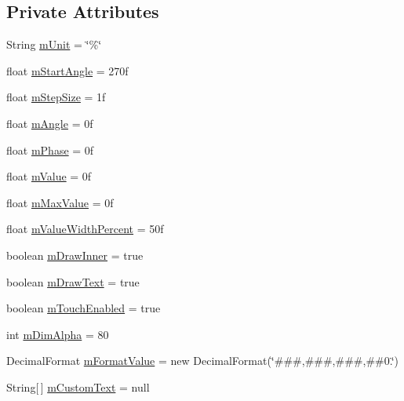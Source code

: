 \subsection*{Private Attributes}
\begin{DoxyCompactItemize}
\item 
String \hyperlink{classcs_1_1usense_1_1_circle_display_aa4629b8ff331f623b98a6380ba49d4be}{m\+Unit} = \char`\"{}\%\char`\"{}
\item 
float \hyperlink{classcs_1_1usense_1_1_circle_display_a5141939196ad8880e27ab7be82f72793}{m\+Start\+Angle} = 270f
\item 
float \hyperlink{classcs_1_1usense_1_1_circle_display_ae35b4776dda580d3aa865f204efcffec}{m\+Step\+Size} = 1f
\item 
float \hyperlink{classcs_1_1usense_1_1_circle_display_a5f3c0c5c31e3f607b7ba95d7d1d0e36d}{m\+Angle} = 0f
\item 
float \hyperlink{classcs_1_1usense_1_1_circle_display_ab4cc3a7bebadc97db4009221587ad1e6}{m\+Phase} = 0f
\item 
float \hyperlink{classcs_1_1usense_1_1_circle_display_ae97b6fa969777e049aca8fab0cb7c9c9}{m\+Value} = 0f
\item 
float \hyperlink{classcs_1_1usense_1_1_circle_display_ac799903a90eebad693869e1c74534ac3}{m\+Max\+Value} = 0f
\item 
float \hyperlink{classcs_1_1usense_1_1_circle_display_a176d021c3d9b4fc092cb6fcfccde335c}{m\+Value\+Width\+Percent} = 50f
\item 
boolean \hyperlink{classcs_1_1usense_1_1_circle_display_ad73b22a7a1f3f35d8544cdb7c80f42b2}{m\+Draw\+Inner} = true
\item 
boolean \hyperlink{classcs_1_1usense_1_1_circle_display_a60190dd53d27e5e1696997ab75532326}{m\+Draw\+Text} = true
\item 
boolean \hyperlink{classcs_1_1usense_1_1_circle_display_a7a78f72cbacddc16ad4c821ac8ce845f}{m\+Touch\+Enabled} = true
\item 
int \hyperlink{classcs_1_1usense_1_1_circle_display_a20e65c1ce5ef4046b08485a4d2bfc403}{m\+Dim\+Alpha} = 80
\item 
Decimal\+Format \hyperlink{classcs_1_1usense_1_1_circle_display_a4f87a1f93144b66dc88a881347bd4a8e}{m\+Format\+Value} = new Decimal\+Format(\char`\"{}\#\#\#,\#\#\#,\#\#\#,\#\#0.\char`\"{})
\item 
String\mbox{[}$\,$\mbox{]} \hyperlink{classcs_1_1usense_1_1_circle_display_a0a78e56096413f30c7d66f496ad6a253}{m\+Custom\+Text} = null
\item 

\end{DoxyCompactItemize}
